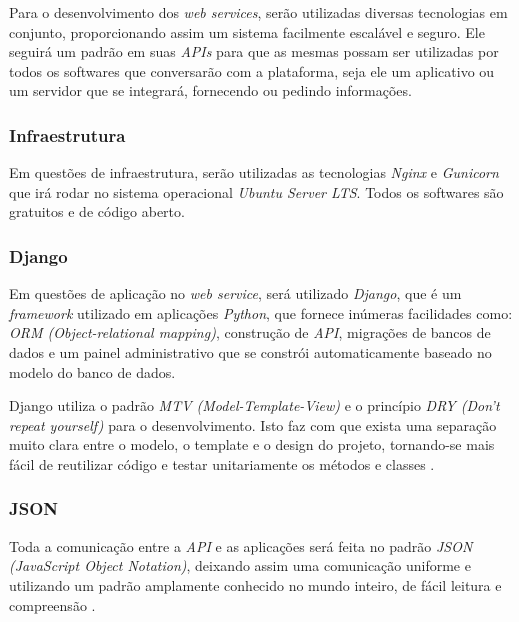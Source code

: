 \documentclass[
	12pt,
	oneside,
	a4paper,
	english,
	brazil,
]{abntex2}
\begin{document}
Para o desenvolvimento dos \emph{web services}, serão utilizadas diversas tecnologias em conjunto, proporcionando assim um sistema facilmente escalável e seguro. Ele seguirá um padrão em suas \emph{APIs} para que as mesmas possam ser utilizadas por todos os softwares que conversarão com a plataforma, seja ele um aplicativo ou um servidor que se integrará, fornecendo ou pedindo informações.

\subsubsection{Infraestrutura}

Em questões de infraestrutura, serão utilizadas as tecnologias \emph{Nginx} e \emph{Gunicorn} que irá rodar no sistema operacional \emph{Ubuntu Server LTS}. Todos os softwares são gratuitos e de código aberto.

\subsubsection{Django}

Em questões de aplicação no \emph{web service}, será utilizado \emph{Django}, que é um \emph{framework} utilizado em aplicações \emph{Python}, que fornece inúmeras facilidades como: \emph{ORM (Object-relational mapping)}, construção de \emph{API}, migrações de bancos de dados e um painel administrativo que se constrói automaticamente baseado no modelo do banco de dados.

Django utiliza o padrão \emph{MTV (Model-Template-View)} e o princípio \emph{DRY (Don't repeat yourself)} para o desenvolvimento. Isto faz com que exista uma separação muito clara entre o modelo, o template e o design do projeto, tornando-se mais fácil de reutilizar código e testar unitariamente os métodos e classes \cite{django-wikipedia}. 

\subsubsection{JSON}

Toda a comunicação entre a \emph{API} e as aplicações será feita no padrão \emph{JSON (JavaScript Object Notation)}, deixando assim uma comunicação uniforme e utilizando um padrão amplamente conhecido no mundo inteiro, de fácil leitura e compreensão \cite{footnote-json}.



\end{document}
